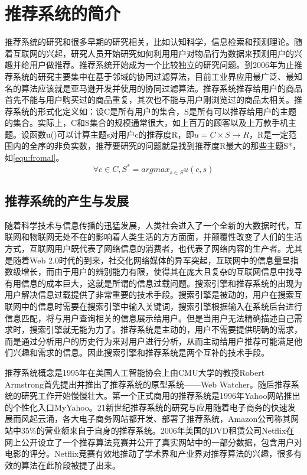\section{推荐系统的简介}
推荐系统的研究和很多早期的研究相关，比如认知科学\citep{cognitive-science}，信息检索和预测理论\citep{Forecast-principle}。随着互联网的兴起，研究人员开始研究如何利用用户对物品行为数据来预测用户的兴趣并给用户做推荐\citep{cf-sn}。推荐系统开始成为一个比较独立的研究问题。到2006年为止推荐系统的研究主要集中在基于邻域的协同过滤算法，目前工业界应用最广泛、最知名的算法应该就是亚马逊开发并使用的协同过滤算法\citep{Amazon-cf}。推荐系统推荐给用户的商品首先不能与用户购买过的商品重复，其次也不能与用户刚浏览过的商品太相关。推荐系统的形式化定义如：设C是所有用户的集合，S是所有可以推荐给用户的主题的集合。实际上，C和S集合的规模通常很大，如上百万的顾客以及上万款手机主题。设函数u()可以计算主题s对用户c的推荐度R，即$u=C\times S \rightarrow R$，R是一定范围内的全序的非负实数，推荐要研究的问题就是找到推荐度R最大的那些主题S*，如\autoref{equ:fromal}。
\begin{equation}
\forall c \in C,S^{*}=arg  max_{s \in S} u(c,s)
\label{equ:fromal}
\end{equation}

	\subsection{推荐系统的产生与发展}
	随着科学技术与信息传播的迅猛发展，人类社会进入了一个全新的大数据时代，互联网和物联网无处不在的影响着人类生活的方方面面，并颠覆性改变了人们的生活方式，互联网用户既代表了网络信息的消费者，也代表了网络内容的生产者。尤其是随着Web 2.0时代的到来，社交化网络媒体的异军突起，互联网中的信息量呈指数级增长，而由于用户的辨别能力有限，使得其在庞大且复杂的互联网信息中找寻有用信息的成本巨大，这就是所谓的信息过载问题\citep{info-overload, info-overload:1}。搜索引擎和推荐系统的出现为用户解决信息过载提供了非常重要的技术手段。搜索引擎是被动的，用户在搜索互联网中的信息时需要在搜索引擎中输入关键词，搜索引擎根据输入在系统后台进行信息匹配，将与用户查询相关的信息展示给用户。但是当用户无法精确描述自己需求时，搜索引擎就无能为力了。推荐系统是主动的，用户不需要提供明确的需求，而是通过分析用户的历史行为来对用户进行分析，从而主动给用户推荐可能满足他们兴趣和需求的信息。因此搜索引擎和推荐系统是两个互补的技术手段。

	推荐系统概念是1995年在美国人工智能协会\citep{recmd-history}上由CMU大学的教授Robert Armstrong首先提出并推出了推荐系统的原型系统——Web Watcher。随后推荐系统的研究工作开始慢慢壮大。第一个正式商用的推荐系统是1996年Yahoo网站推出的个性化入口MyYahoo。21新世纪推荐系统的研究与应用随着电子商务的快速发展而风起云涌，各大电子商务网站都开发、部署了推荐系统，Amazon公司称其网站中35\%的营业额来自于自身的推荐系统。2006年美国的DVD租赁公司Netflix\citep{recmd-netflix}在网上公开设立了一个推荐算法竞赛并公开了真实网站中的一部分数据，包含用户对电影的评分。Netflix竞赛有效地推动了学术界和产业界对推荐算法的兴趣，很多有效的算法在此阶段被提了出来。

